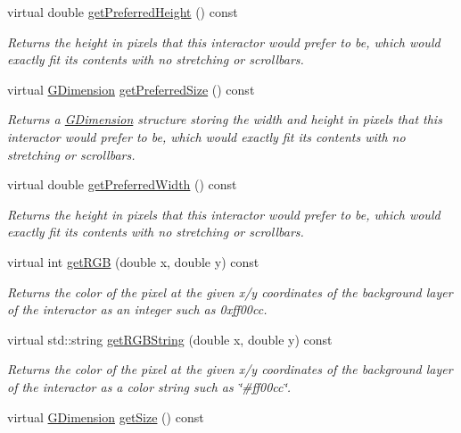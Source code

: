 \begin{DoxyCompactItemize}
virtual double \mbox{\hyperlink{classGInteractor_a747de0961653847bdc6615dbf756d715}{get\+Preferred\+Height}} () const
\begin{DoxyCompactList}\small\item\em Returns the height in pixels that this interactor would prefer to be, which would exactly fit its contents with no stretching or scrollbars. \end{DoxyCompactList}\item 
virtual \mbox{\hyperlink{structGDimension}{G\+Dimension}} \mbox{\hyperlink{classGInteractor_a4aabbee761d8e9116275401131b7ccd1}{get\+Preferred\+Size}} () const
\begin{DoxyCompactList}\small\item\em Returns a \mbox{\hyperlink{structGDimension}{G\+Dimension}} structure storing the width and height in pixels that this interactor would prefer to be, which would exactly fit its contents with no stretching or scrollbars. \end{DoxyCompactList}\item 
virtual double \mbox{\hyperlink{classGInteractor_a82bca31d37700fb0e35d2743352efd5e}{get\+Preferred\+Width}} () const
\begin{DoxyCompactList}\small\item\em Returns the height in pixels that this interactor would prefer to be, which would exactly fit its contents with no stretching or scrollbars. \end{DoxyCompactList}\item 
virtual int \mbox{\hyperlink{classGDrawingSurface_a9e983467cf0c97cfd62433a8471570dc}{get\+R\+GB}} (double x, double y) const
\begin{DoxyCompactList}\small\item\em Returns the color of the pixel at the given x/y coordinates of the background layer of the interactor as an integer such as 0xff00cc. \end{DoxyCompactList}\item 
virtual std\+::string \mbox{\hyperlink{classGDrawingSurface_a456d3582acc3544f37d939f5cb8802fe}{get\+R\+G\+B\+String}} (double x, double y) const
\begin{DoxyCompactList}\small\item\em Returns the color of the pixel at the given x/y coordinates of the background layer of the interactor as a color string such as \char`\"{}\#ff00cc\char`\"{}. \end{DoxyCompactList}\item 
virtual \mbox{\hyperlink{structGDimension}{G\+Dimension}} \mbox{\hyperlink{classGInteractor_a7b4eec96a2bdc6420695d5796a78eea9}{get\+Size}} () const

\end{DoxyCompactItemize}
